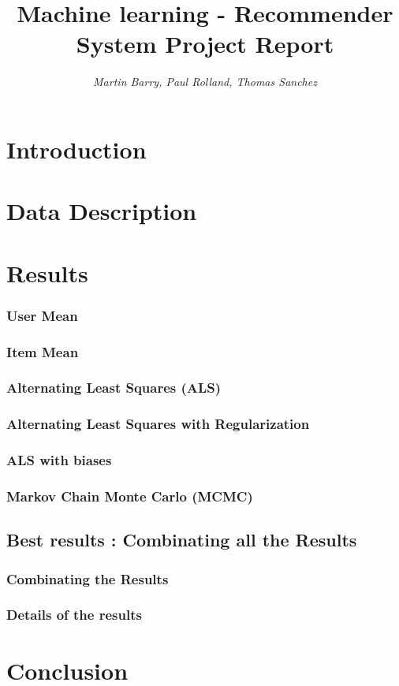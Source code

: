 \documentclass[10pt,conference,compsocconf]{IEEEtran}
\begin{document}
\title{Machine learning - Recommender System Project Report}
\author{\textit{Martin Barry, Paul Rolland, Thomas Sanchez}}

\maketitle

\section{Introduction}

\section{Data Description}
\section{Results}
\subsubsection{User Mean}
\subsubsection{Item Mean}
\subsubsection{Alternating Least Squares (ALS)}
\subsubsection{Alternating Least Squares with Regularization}
\subsubsection{ALS with biases}
\cite{rendleTist2012}
\subsubsection{Markov Chain Monte Carlo (MCMC)}
\subsection{Best results : Combinating all the Results}
\subsubsection{Combinating the Results}



\subsubsection{Details of the results}


\section{Conclusion}



\end{document}
